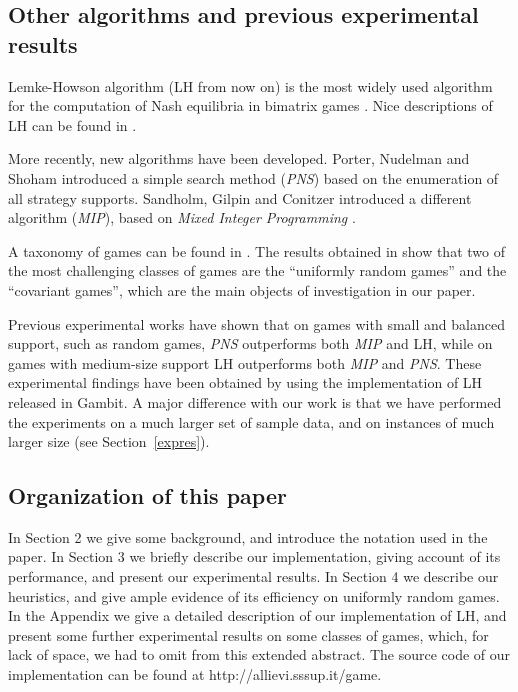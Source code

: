 \documentclass[11pt]{article}
\begin{document}
\subsection{Other algorithms and previous experimental results}

Lemke-Howson algorithm (LH from now on) is the most widely used
algorithm for the computation of Nash equilibria in bimatrix games
\cite{lh}. Nice descriptions of LH can be found in
\cite{shapley,vstengel}.


More recently, new algorithms have been developed. Porter, Nudelman
and Shoham \cite{simple} introduced a simple search method
(\emph{PNS}) based on the enumeration of all strategy supports.
Sandholm, Gilpin and Conitzer introduced a different algorithm
(\emph{MIP}), based on \emph{Mixed Integer Programming}
 \cite{mip}.

A taxonomy of games can
be found in \cite{gamut}. The results obtained in \cite{gamut,simple}
show that two of the
most challenging classes of games are the ``uniformly random games''
and the ``covariant games'', which are the main objects
of investigation in our paper.

Previous experimental works \cite{simple,mip} have shown that on
games with small and balanced support, such as random games,
\emph{PNS} outperforms both \emph{MIP} and LH, while on games with
medium-size support LH outperforms both \emph{MIP} and \emph{PNS}.
These experimental findings have been obtained by using the
implementation of LH released in Gambit. A major difference with our
work is that we have performed the experiments on a much larger set
of sample data, and on instances of much larger size (see
Section~\ref{expres}).

\subsection{Organization of this paper}

In Section 2 we give some background, and introduce the
notation used in the paper. In Section 3 we briefly describe our
implementation, giving account of its performance, and present our
experimental results. In Section 4 we describe our
heuristics, and give ample evidence of its efficiency on uniformly
random games. In the Appendix we give a detailed description of our
implementation of LH, and present some further experimental results
on some classes of games, which, for lack of space, we had to omit
from this extended abstract. The source code of our implementation 
can be found at http://allievi.sssup.it/game.
\end{document}
